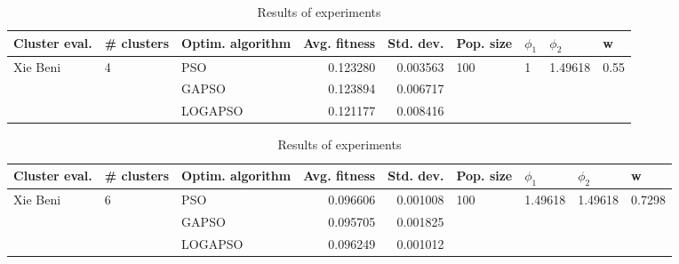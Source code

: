 \documentclass{article}
\begin{document}
\begin{table}
\centering
\caption{Results of experiments}
\begin{tabular}{lllrrllll}
\toprule
            Cluster eval. &        \# clusters & Optim. algorithm &  Avg. fitness &  Std. dev. &            Pop. size &         $\phi_{1}$ &               $\phi_{2}$ &                     w \\
\midrule
\multirow{3}{*}{Xie Beni} & \multirow{3}{*}{4} &              PSO &      0.123280 &   0.003563 & \multirow{3}{*}{100} & \multirow{3}{*}{1} & \multirow{3}{*}{1.49618} & \multirow{3}{*}{0.55} \\
                          &                    &            GAPSO &      0.123894 &   0.006717 &                      &                    &                          &                       \\
                          &                    &          LOGAPSO &      0.121177 &   0.008416 &                      &                    &                          &                       \\
\bottomrule
\end{tabular}
\end{table}
\begin{table}
\centering
\caption{Results of experiments}
\begin{tabular}{lllrrllll}
\toprule
            Cluster eval. &        \# clusters & Optim. algorithm &  Avg. fitness &  Std. dev. &            Pop. size &               $\phi_{1}$ &               $\phi_{2}$ &                       w \\
\midrule
\multirow{3}{*}{Xie Beni} & \multirow{3}{*}{6} &              PSO &      0.096606 &   0.001008 & \multirow{3}{*}{100} & \multirow{3}{*}{1.49618} & \multirow{3}{*}{1.49618} & \multirow{3}{*}{0.7298} \\
                          &                    &            GAPSO &      0.095705 &   0.001825 &                      &                          &                          &                         \\
                          &                    &          LOGAPSO &      0.096249 &   0.001012 &                      &                          &                          &                         \\
\bottomrule
\end{tabular}
\end{table}
\end{document}
